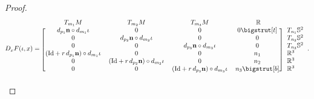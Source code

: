 \documentclass[11pt]{article}
\newcommand{\R}{\mathbb{R}}
\newcommand{\io}{\iota}
\newcommand{\nbf}{\mathbf{n}}
\newcommand{\Id}{\mathrm{Id}}
\newcommand\topstrut[1][1.2ex]{\setlength\bigstrutjot{#1}{\bigstrut[t]}}
\newcommand\botstrut[1][1.2ex]{\setlength\bigstrutjot{#1}{\bigstrut[b]}}
\theoremstyle{plain}
\theoremstyle{definition}
\theoremstyle{remark}
\begin{document}
\begin{proof}
\begin{equation*}
	D_x F(\io, x) =
	\begin{blockarray}{cccc l}
		\begin{block}{cccc l}
			T_{m_1} M & T_{m_2} M & T_{m_3} M & ~~\R~~ & \\
		\end{block}
		\begin{block}{[cccc] l}
			d_{p_1} \nbf \circ d_{m_1} \io & 0 & 0 & 0 \topstrut  & T_{n_1} \mathbb{S}^2 \\
			0 & d_{p_2} \nbf \circ d_{m_2} \io & 0 & 0 & T_{n_2} \mathbb{S}^2   \\
			0 & 0 & d_{p_3} \nbf \circ d_{m_3} \io & 0 & T_{n_3} \mathbb{S}^2   \\
			(\Id + r \, d_{p_1} \nbf) \circ d_{m_1} \io & 0 & 0 & n_1 & \R^3 \\
			0 & (\Id + r \, d_{p_2} \nbf) \circ d_{m_2} \io & 0 & n_2 & \R^3  \\
			0 & 0 & (\Id + r \, d_{p_3} \nbf) \circ d_{m_3} \io  & n_3 \botstrut & \R^3  \\
		\end{block}
	\end{blockarray}.
\end{equation*}


\end{proof}
\end{document}
